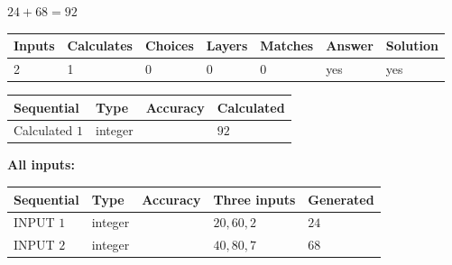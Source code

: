 \documentclass[12pt]{article}
\begin{document}
 

$ %
24 +  %
68=   %
92$
 
 
\noindent{}
 
 

 
   
   
   
   
\noindent\begin{tabular}{|l|l|l|l|l|l|l|}
 \hline
Inputs & Calculates & Choices & Layers & Matches & Answer & Solution \\ \hline
 2  & 
 1  & 
 0
  & 
 0  & 
 0  & 
  yes & 
  yes 
  \\ \hline
 \end{tabular}
   
   
   
   
\noindent{}
   
   
  
  
\noindent\begin{tabular}{|l|l|l|l|}
\hline
 Sequential & Type & Accuracy & Calculated \\ 
\hline
 
 
  Calculated $  1 $ & integer &  & 
  $ 92 $ 
 \\  \hline  
 \end{tabular}
   
   
   
   
\noindent\vspace{0.1in}\hspace{-0.08in} {\textbf{\Large{All inputs: }}}
   
   
  
  
\noindent\begin{tabular}{|l|l|l|l|l|}
\hline
 Sequential & Type & Accuracy & Three inputs & Generated \\ 
\hline
 
 
  INPUT $  1 $ & integer &  & $
 20
 , 
 60
 , 
 2
 $ & $ 24 $ 
 \\  \hline  
 
 
  INPUT $  2 $ & integer &  & $
 40
 , 
 80
 , 
 7
 $ & $ 68 $ 
 \\  \hline  
 \end{tabular}
   
   
   
   
   
   
 \vspace{0.2in}
 
\end{document}
